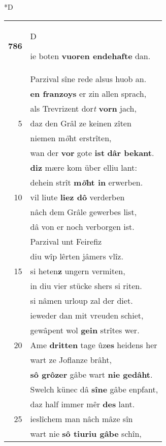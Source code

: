 \documentclass[8pt,a4paper,notitlepage]{article}
\begin{document}
\begin{table}[ht]
\begin{minipage}[t]{0.5\linewidth}
\small
\begin{center}*D
\end{center}
\begin{tabular}{rl}
\textbf{786} & \begin{large}D\end{large}ie boten \textbf{vuoren endehafte} dan.\\ 
 & Parzival sîne rede alsus huob an.\\ 
 & \textbf{en franzoys} er zin allen sprach,\\ 
 & als Trevrizent dor\textit{t} \textbf{vorn} jach,\\ 
5 & daz den Grâl ze keinen zîten\\ 
 & niemen m\textit{ö}ht erstrîten,\\ 
 & wan der \textbf{vor} gote \textbf{ist} \textbf{dâr bekant}.\\ 
 & \textbf{diz} mære kom über elliu lant:\\ 
 & dehein strît \textbf{m\textit{ö}ht in} erwerben.\\ 
10 & vil liute \textbf{liez dô} verderben\\ 
 & nâch dem Grâle gewerbes list,\\ 
 & dâ von er noch verborgen ist.\\ 
 & Parzival unt Feirefiz\\ 
 & diu wîp lêrten jâmers vlîz.\\ 
15 & si heten\textbf{z} ungern vermiten,\\ 
 & in diu vier stücke shers si riten.\\ 
 & si nâmen urloup zal der diet.\\ 
 & ieweder dan mit vreuden schiet,\\ 
 & gewâpent wol \textbf{gein} strîtes wer.\\ 
20 & Ame \textbf{dritten} tage ûz\textbf{es} heidens her\\ 
 & wart ze Joflanze brâht,\\ 
 & \textbf{sô grôzer} gâbe wart \textbf{nie gedâht}.\\ 
 & Swelch künec dâ \textbf{sîne} gâbe enpfant,\\ 
 & daz half immer mêr \textbf{des} lant.\\ 
25 & ieslîchem man nâch mâze sîn\\ 
 & wart nie \textbf{sô tiuriu gâbe} schîn,\\ 

\end{tabular}
\end{minipage}
\end{table}
\end{document}
